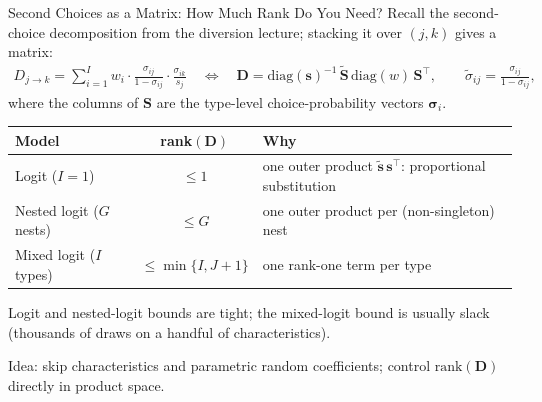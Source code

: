 \documentclass[aspectratio=169,10pt]{beamer}
\begin{document}
\begin{frame}{Second Choices as a Matrix: How Much Rank Do You Need?}
Recall the second-choice decomposition from the diversion lecture; stacking it over $(j,k)$ gives a matrix:
\begin{align*}
D_{j \rightarrow k} = \sum_{i=1}^I w_i \cdot \frac{\sigma_{ij}}{1-\sigma_{ij}} \cdot \frac{\sigma_{ik}}{s_j}
\quad\Longleftrightarrow\quad
\symbf{D} = \text{diag}(\symbf{s})^{-1}\, \widetilde{\symbf{S}}\, \text{diag}(w)\, \symbf{S}^{\top},
\qquad \widetilde{\sigma}_{ij} = \tfrac{\sigma_{ij}}{1-\sigma_{ij}},
\end{align*}
where the columns of $\symbf{S}$ are the type-level choice-probability vectors $\symbf{\sigma}_i$.
\vspace{-0.1cm}
\begin{center}
\renewcommand{\arraystretch}{1.3}
\small
\begin{tabular}{lcl}
\toprule
\textbf{Model} & \textbf{rank}$(\symbf{D})$ & \textbf{Why} \\
\midrule
Logit ($I=1$) & $\leq 1$ & one outer product $\widetilde{\symbf{s}}\,\symbf{s}^{\top}$: proportional substitution \\
Nested logit ($G$ nests) & $\leq G$ & one outer product per (non-singleton) nest \\
Mixed logit ($I$ types) & $\leq \min\{I, J+1\}$ & one rank-one term per type \\
\bottomrule
\end{tabular}
\end{center}
\vspace{-0.1cm}
\begin{wideitemize}
    \item Logit and nested-logit bounds are \alert{tight}; the mixed-logit bound is usually slack (thousands of draws on a handful of characteristics).
    \item Idea: skip characteristics and parametric random coefficients; \alert{control $\text{rank}(\symbf{D})$ directly} in product space.
\end{wideitemize}
\end{frame}
\end{document}
